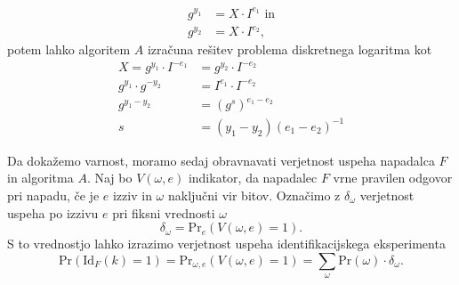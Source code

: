 \documentclass[isrm2, tisk]{fmfdelo}
\begin{document}
\begin{dokaz}
\begin{enumerate}
            \begin{align*}
                g^{y_1} &= X \cdot I^{e_1} \text{ in} \\
                g^{y_2} &= X \cdot I^{e_2},
            \end{align*}
            potem lahko algoritem $A$ izračuna rešitev problema diskretnega logaritma kot
            \begin{align*}
                X = g^{y_1} \cdot I^{-e_1} &= g^{y_2} \cdot I^{-e_2} \\
                g^{y_1} \cdot g^{-y_2} &= I^{e_1} \cdot I^{-e_2} \\
                g^{y_1 - y_2} &= (g^s)^{e_1 - e_2} \\
                s &= (y_1 - y_2)(e_1 - e_2)^{-1}
            \end{align*}
    \end{enumerate}

    Da dokažemo varnost, moramo sedaj obravnavati verjetnost uspeha napadalca $F$ in algoritma $A$.
    Naj bo $V(\omega, e)$ indikator, da napadalec $F$ vrne pravilen odgovor pri napadu, če je $e$ izziv
    in $\omega$ naključni vir bitov. Označimo z $\delta_{\omega}$ verjetnost uspeha po izzivu $e$
    pri fiksni vrednosti $\omega$
    $$
    \delta_{\omega} = \text{Pr}_e(V(\omega, e) = 1).
    $$
    S to vrednostjo lahko izrazimo verjetnost uspeha identifikacijskega eksperimenta
    $$
    \text{Pr}(\text{Id}_F(k) = 1) = \text{Pr}_{\omega, e}(V(\omega, e) = 1) =
        \sum_{\omega} \text{Pr}(\omega) \cdot \delta_{\omega}.
    $$


\end{dokaz}
\end{document}
